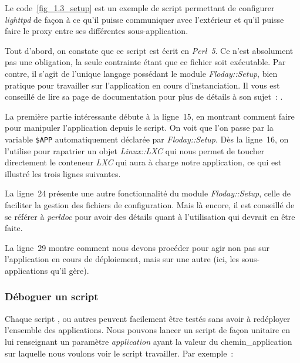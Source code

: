 Le code~\ref{fig_1.3_setup} est un exemple de script permettant de configurer \emph{lighttpd} de façon à ce qu'il puisse communiquer avec l'extérieur et qu'il puisse faire le proxy entre ses différentes \gls{sous-application}.



Tout d'abord, on constate que ce script est écrit en \emph{Perl~5}.
Ce n'est absolument pas une obligation, la seule contrainte étant que ce fichier soit exécutable.
Par contre, il s'agit de l'unique langage possédant le module \emph{Floday::Setup}, bien pratique pour travailler sur l'\gls{application} en cours d'instanciation.
Il vous est conseillé de lire sa page de documentation pour plus de détails à son sujet~: .

La première partie intéressante débute à la ligne~15, en montrant comment faire pour manipuler l'application depuis le script.
On voit que l'on passe par la variable {\tt\$APP} automatiquement déclarée par \emph{Floday::Setup}.
Dès la ligne~16, on l'utilise pour rapatrier un objet \emph{Linux::LXC} qui nous permet de toucher directement le conteneur \emph{LXC} qui aura à charge notre application, ce qui est illustré les trois lignes suivantes.

La ligne~24 présente une autre fonctionnalité du module \emph{Floday::Setup}, celle de faciliter la gestion des fichiers de configuration.
Mais là encore, il est conseillé de se référer à \emph{perldoc} pour avoir des détails quant à l'utilisation qui devrait en être faite.

La ligne~29 montre comment nous devons procéder pour agir non pas sur l'application en cours de déploiement, mais sur une autre (ici, les \glspl{sous-application} qu'il gère).

\subsubsection{Déboguer un script}

Chaque script ,  ou autres peuvent facilement être testés sans avoir à redéployer l'ensemble des applications.
Nous pouvons lancer un script de façon unitaire en lui renseignant un paramètre \emph{application} ayant la valeur du \gls{chemin_application} sur laquelle nous voulons voir le script travailler.
Par exemple~:

